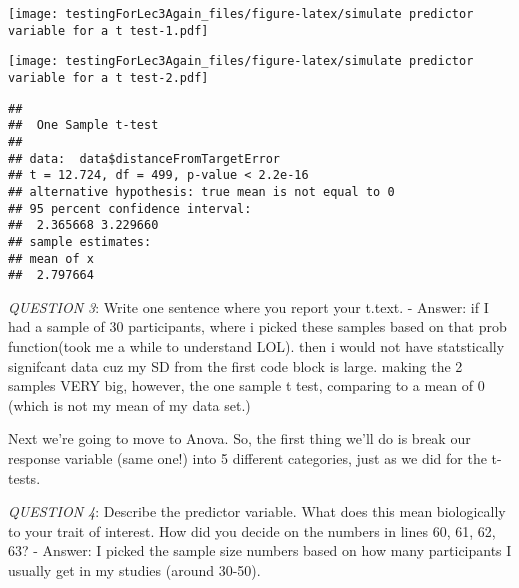\documentclass[
]{article}
\newenvironment{Shaded}{\begin{snugshade}}{\end{snugshade}}
\newcommand{\AlertTok}[1]{\textcolor[rgb]{0.94,0.16,0.16}{#1}}
\newcommand{\AttributeTok}[1]{\textcolor[rgb]{0.13,0.29,0.53}{#1}}
\newcommand{\DocumentationTok}[1]{\textcolor[rgb]{0.56,0.35,0.01}{\textbf{\textit{#1}}}}
\newcommand{\FunctionTok}[1]{\textcolor[rgb]{0.13,0.29,0.53}{\textbf{#1}}}
\newcommand{\NormalTok}[1]{#1}
\newcommand{\SpecialCharTok}[1]{\textcolor[rgb]{0.81,0.36,0.00}{\textbf{#1}}}
\newcommand{\StringTok}[1]{\textcolor[rgb]{0.31,0.60,0.02}{#1}}
\begin{document}
\texttt{[image: testingForLec3Again\_files/figure-latex/simulate predictor variable for a t test-1.pdf]}

\begin{Shaded}
\end{Shaded}

\texttt{[image: testingForLec3Again\_files/figure-latex/simulate predictor variable for a t test-2.pdf]}

\begin{Shaded}
\end{Shaded}

\begin{verbatim}
## 
##  One Sample t-test
## 
## data:  data$distanceFromTargetError
## t = 12.724, df = 499, p-value < 2.2e-16
## alternative hypothesis: true mean is not equal to 0
## 95 percent confidence interval:
##  2.365668 3.229660
## sample estimates:
## mean of x 
##  2.797664
\end{verbatim}

\emph{QUESTION 3}: Write one sentence where you report your t.text. -
Answer: if I had a sample of 30 participants, where i picked these
samples based on that prob function(took me a while to understand LOL).
then i would not have statstically signifcant data cuz my SD from the
first code block is large. making the 2 samples VERY big, however, the
one sample t test, comparing to a mean of 0 (which is not my mean of my
data set.)

Next we're going to move to Anova. So, the first thing we'll do is break
our response variable (same one!) into 5 different categories, just as
we did for the t-tests.

\emph{QUESTION 4}: Describe the predictor variable. What does this mean
biologically to your trait of interest. How did you decide on the
numbers in lines 60, 61, 62, 63? - Answer: I picked the sample size
numbers based on how many participants I usually get in my studies
(around 30-50).
\end{document}
